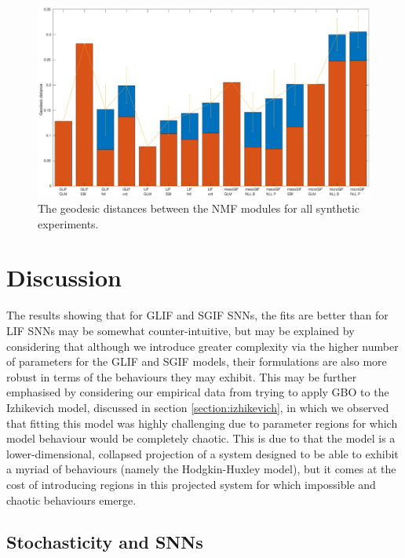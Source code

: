 \documentclass[mphil,deptreport,ianc]{infthesis} %
\begin{document}
\begin{figure}
    \hspace{-0.1\columnwidth}
    \includegraphics[width=1.2\columnwidth]{figures/matlab/NMF_geodesic_all_Synthetic_v2.eps}
    \caption{The geodesic distances between the NMF modules for all synthetic experiments.}
    \label{fig:geodesic_all}
\end{figure}


\section{Discussion}

The results showing that for GLIF and SGIF SNNs, the fits are better than for LIF SNNs may be somewhat counter-intuitive, but may be explained by considering that although we introduce greater complexity via the higher number of parameters for the GLIF and SGIF models, their formulations are also more robust in terms of the behaviours they may exhibit.
This may be further emphasised by considering our empirical data from trying to apply GBO to the Izhikevich model, discussed in section \ref{section:izhikevich}, in which we observed that fitting this model was highly challenging due to parameter regions for which model behaviour would be completely chaotic.
This is due to that the model is a lower-dimensional, collapsed projection of a system designed to be able to exhibit a myriad of behaviours (namely the Hodgkin-Huxley \cite{HH1952} model), but it comes at the cost of introducing regions in this projected system for which impossible and chaotic behaviours emerge.

\subsection*{Stochasticity and SNNs}
\end{document}
